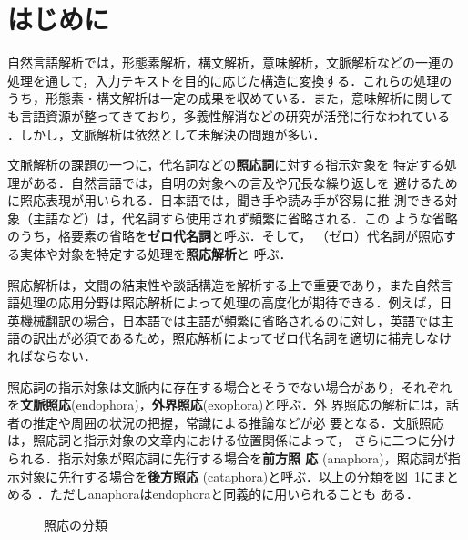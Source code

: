 

\maketitle



\section{はじめに}
\label{sec:introduction}

自然言語解析では，形態素解析，構文解析，意味解析，文脈解析などの一連の
処理を通して，入力テキストを目的に応じた構造に変換する．これらの処理の
うち，形態素・構文解析は一定の成果を収めている．また，意味解析に関して
も言語資源が整ってきており，多義性解消などの研究が活発に行なわれている
\cite{kilgarriff98}．しかし，文脈解析は依然として未解決の問題が多い．

文脈解析の課題の一つに，代名詞などの{\bf 照応詞}に対する指示対象を
特定する処理がある．自然言語では，自明の対象への言及や冗長な繰り返しを
避けるために照応表現が用いられる．日本語では，聞き手や読み手が容易に推
測できる対象（主語など）は，代名詞すら使用されず頻繁に省略される．この
ような省略のうち，格要素の省略を{\bf ゼロ代名詞}と呼ぶ．そして，
（ゼロ）代名詞が照応する実体や対象を特定する処理を{\bf 照応解析}と
呼ぶ．

照応解析は，文間の結束性や談話構造を解析する上で重要であり，また自然言
語処理の応用分野は照応解析によって処理の高度化が期待できる．例えば，日
英機械翻訳の場合，日本語では主語が頻繁に省略されるのに対し，英語では主
語の訳出が必須であるため，照応解析によってゼロ代名詞を適切に補完しなけ
ればならない\cite{naka93}．

照応詞の指示対象は文脈内に存在する場合とそうでない場合があり，それぞれ
を{\bf 文脈照応}(endophora)，{\bf 外界照応}(exophora)と呼ぶ．外
界照応の解析には，話者の推定や周囲の状況の把握，常識による推論などが必
要となる．文脈照応は，照応詞と指示対象の文章内における位置関係によって，
さらに二つに分けられる．指示対象が照応詞に先行する場合を{\bf 前方照
  応} (anaphora)，照応詞が指示対象に先行する場合を{\bf 後方照応}
(cataphora)と呼ぶ．以上の分類を図~\ref{fig:ana_kinds}にまとめる
\cite{halliday76}．ただしanaphoraはendophoraと同義的に用いられることも
ある．

\begin{figure}[htbp]
  \begin{center}
    \caption{照応の分類}
    \label{fig:ana_kinds}
  \end{center}
\end{figure}

